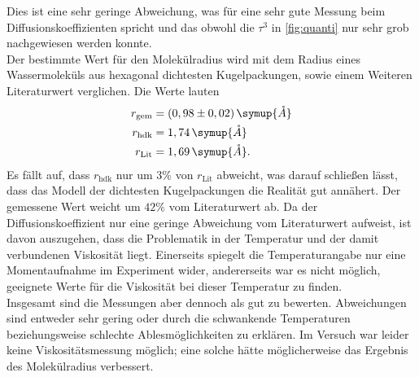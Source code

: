 Dies ist eine sehr geringe Abweichung, was für eine sehr gute Messung beim Diffusionskoeffizienten spricht
und das obwohl die $\tau^3$ in \autoref{fig:quanti} nur sehr grob nachgewiesen werden konnte.\\
Der bestimmte Wert für den Molekülradius wird mit dem Radius eines Wassermoleküls aus hexagonal dichtesten 
Kugelpackungen, sowie einem Weiteren Literaturwert\cite{radius} verglichen. Die Werte lauten
\begin{align*}
    r_{\text{gem}} &= (0,98 \pm 0,02) \, \symup{\mathring{A}}\\
    r_{\text{hdk}} &=1,74 \, \symup{\mathring{A}} \\
    r_{\text{Lit}} &= 1,69 \, \symup{\mathring{A}}. 
\end{align*}
Es fällt auf, dass $r_{\text{hdk}}$ nur um $3\%$ von $r_{\text{Lit}}$ abweicht, was darauf schließen lässt, 
dass das Modell der dichtesten Kugelpackungen die Realität gut annähert. Der gemessene Wert weicht 
um $42\%$ vom Literaturwert ab. Da der Diffusionskoeffizient nur eine geringe Abweichung vom 
Literaturwert aufweist, ist davon auszugehen, dass die Problematik in der Temperatur und der damit 
verbundenen Viskosität liegt. Einerseits spiegelt die Temperaturangabe nur eine Momentaufnahme im Experiment 
wider, andererseits war es nicht möglich, geeignete Werte für die Viskosität bei dieser Temperatur zu finden. \\
Insgesamt sind die Messungen aber dennoch als gut zu bewerten. Abweichungen sind entweder sehr gering oder 
durch die schwankende Temperaturen beziehungsweise schlechte Ablesmöglichkeiten zu erklären.
Im Versuch war leider keine Viskositätsmessung möglich; eine solche hätte möglicherweise das Ergebnis des
Molekülradius verbessert.

